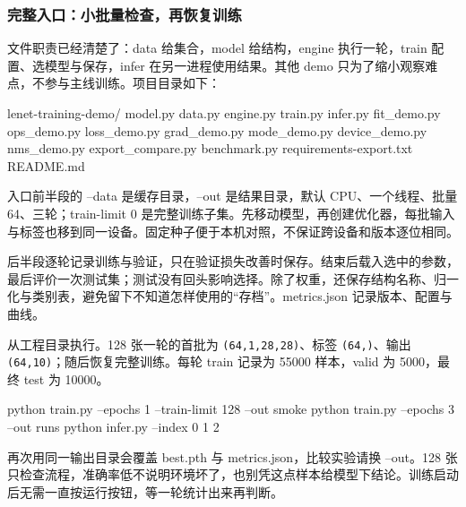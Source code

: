 \subsubsection{完整入口：小批量检查，再恢复训练}
文件职责已经清楚了：data 给集合，model 给结构，engine 执行一轮，train 配置、选模型与保存，infer 在另一进程使用结果。其他 demo 只为了缩小观察难点，不参与主线训练。项目目录如下：
\begin{tbash}
lenet-training-demo/
  model.py  data.py  engine.py  train.py  infer.py
  fit_demo.py  ops_demo.py  loss_demo.py  grad_demo.py  mode_demo.py
  device_demo.py  nms_demo.py  export_compare.py  benchmark.py
  requirements-export.txt  README.md
\end{tbash}
入口前半段的 --data 是缓存目录，--out 是结果目录，默认 CPU、一个线程、批量 64、三轮；train-limit 0 是完整训练子集。先移动模型，再创建优化器，每批输入与标签也移到同一设备。固定种子便于本机对照，不保证跨设备和版本逐位相同。
\begin{dlblock}

\end{dlblock}
后半段逐轮记录训练与验证，只在验证损失改善时保存。结束后载入选中的参数，最后评价一次测试集；测试没有回头影响选择。除了权重，还保存结构名称、归一化与类别表，避免留下不知道怎样使用的“存档”。metrics.json 记录版本、配置与曲线。
\begin{dlblock}

\end{dlblock}
\begin{example}[先确认代码能绕回来]
从工程目录执行。128 张一轮的首批为 \texttt{(64,1,28,28)}、标签 \texttt{(64,)}、输出 \texttt{(64,10)}；随后恢复完整训练。每轮 train 记录为 55000 样本，valid 为 5000，最终 test 为 10000。
\begin{tbash}
python train.py --epochs 1 --train-limit 128 --out smoke
python train.py --epochs 3 --out runs
python infer.py --index 0 1 2
\end{tbash}
\end{example}
\begin{note}
再次用同一输出目录会覆盖 best.pth 与 metrics.json，比较实验请换 --out。128 张只检查流程，准确率低不说明环境坏了，也别凭这点样本给模型下结论。训练启动后无需一直按运行按钮，等一轮统计出来再判断。
\end{note}
